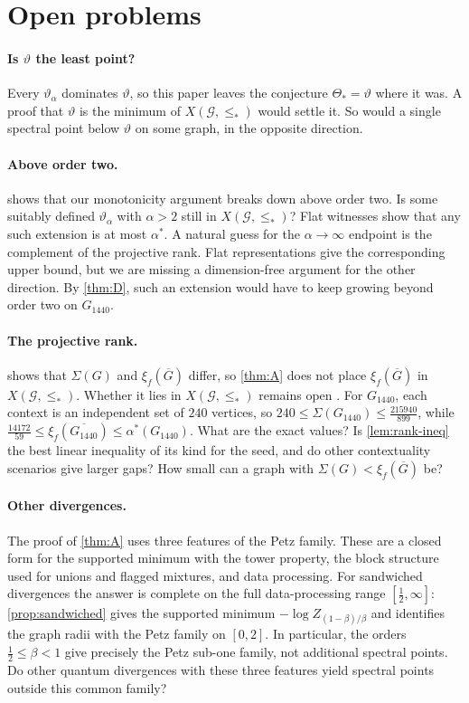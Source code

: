 \documentclass[11pt]{article}
\theoremstyle{definition}
\newcommand{\vt}{\vartheta}
\newcommand{\cG}{\mathcal G}
\newcommand{\Xs}{X(\cG,\le_*)}
\begin{document}
\section{Open problems}\label{sec:open}

\paragraph{Is $\vt$ the least point?}
Every $\vt_\alpha$ dominates $\vt$, so this paper leaves the conjecture
$\Theta_*=\vt$ where it was.  A proof that $\vt$ is the minimum of $\Xs$ would
settle it.  So would a single spectral point below $\vt$ on some graph, in the
opposite direction.

\paragraph{Above order two.}
 shows that our monotonicity argument breaks down above
order two.  Is some suitably defined $\vt_\alpha$ with $\alpha>2$ still in
$\Xs$?  Flat witnesses show that any such extension is at most $\alpha^*$.
A natural guess for the $\alpha\to\infty$ endpoint is the complement of the
projective rank.  Flat representations give the corresponding upper bound, but
we are missing a dimension-free argument for the other direction.  By
\cref{thm:D}, such an extension would have to keep growing beyond order two on
$G_{1440}$.

\paragraph{The projective rank.}
 shows that $\Sigma(G)$ and $\xi_f(\overline G)$ differ, so
\cref{thm:A} does not place $\xi_f(\overline G)$ in $\Xs$.  Whether it lies in
$\Xs$ remains open \cite[after Proposition~24]{LiZuiddam2020}.  For
$G_{1440}$, each context is an independent set of $240$ vertices, so
$240\le\Sigma(G_{1440})\le\frac{215940}{899}$, while
$\frac{14172}{59}\le\xi_f(\overline{G_{1440}})\le\alpha^*(G_{1440})$.  What are
the exact values?  Is \cref{lem:rank-ineq} the best linear inequality of its
kind for the seed, and do other contextuality scenarios give larger gaps?
How small can a graph with $\Sigma(G)<\xi_f(\overline G)$ be?

\paragraph{Other divergences.}
The proof of \cref{thm:A} uses three features of the Petz family.  These are
a closed form for the supported minimum with the tower property, the
block structure used for unions and flagged mixtures, and data processing.
For sandwiched divergences the answer is complete on the full
data-processing range $[\frac12,\infty]$: \cref{prop:sandwiched} gives the
supported minimum $-\log Z_{(1-\beta)/\beta}$ and identifies the graph
radii with the Petz family on $[0,2]$.  In particular, the orders
$\frac12\le\beta<1$ give precisely the Petz sub-one family, not additional
spectral points.  Do other quantum divergences with these three features
yield spectral points outside this common family?
\end{document}
